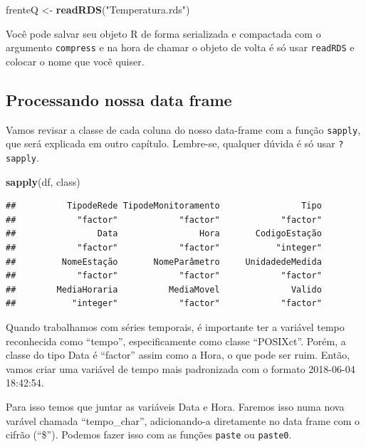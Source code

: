\documentclass[]{book}
\newenvironment{Shaded}{\begin{snugshade}}{\end{snugshade}}
\newcommand{\KeywordTok}[1]{\textcolor[rgb]{0.13,0.29,0.53}{\textbf{#1}}}
\newcommand{\StringTok}[1]{\textcolor[rgb]{0.31,0.60,0.02}{#1}}
\newcommand{\NormalTok}[1]{#1}
\theoremstyle{definition}
\theoremstyle{definition}
\theoremstyle{definition}
\theoremstyle{remark}
\begin{document}
\begin{Shaded}
\begin{Highlighting}[]
\NormalTok{frenteQ <-}\StringTok{ }\KeywordTok{readRDS}\NormalTok{(}\StringTok{"Temperatura.rds"}\NormalTok{)}
\end{Highlighting}
\end{Shaded}

Você pode salvar seu objeto R de forma serializada e compactada com o
argumento \texttt{compress} e na hora de chamar o objeto de volta é só
usar \texttt{readRDS} e colocar o nome que você quiser.

\hypertarget{processing_dfs}{\subsection{Processando nossa data
frame}\label{processing_dfs}}

Vamos revisar a classe de cada coluna do nosso data-frame com a função
\texttt{sapply}, que será explicada em outro capítulo. Lembre-se,
qualquer dúvida é só usar \texttt{?sapply}.

\begin{Shaded}
\begin{Highlighting}[]
\KeywordTok{sapply}\NormalTok{(df, class)}
\end{Highlighting}
\end{Shaded}

\begin{verbatim}
##          TipodeRede TipodeMonitoramento                Tipo 
##            "factor"            "factor"            "factor" 
##                Data                Hora       CodigoEstação 
##            "factor"            "factor"           "integer" 
##         NomeEstação       NomeParâmetro     UnidadedeMedida 
##            "factor"            "factor"            "factor" 
##        MediaHoraria          MediaMovel              Valido 
##           "integer"            "factor"            "factor"
\end{verbatim}

Quando trabalhamos com séries temporais, é importante ter a variável
tempo reconhecida como ``tempo'', especificamente como classe
``POSIXct''. Porém, a classe do tipo Data é ``factor'' assim como a
Hora, o que pode ser ruim. Então, vamos criar uma variável de tempo mais
padronizada com o formato 2018-06-04 18:42:54.

Para isso temos que juntar as variáveis Data e Hora. Faremos isso numa
nova varável chamada ``tempo\_char'', adicionando-a diretamente no data
frame com o cifrão (``\$''). Podemos fazer isso com as funções
\texttt{paste} ou \texttt{paste0}.
\end{document}
